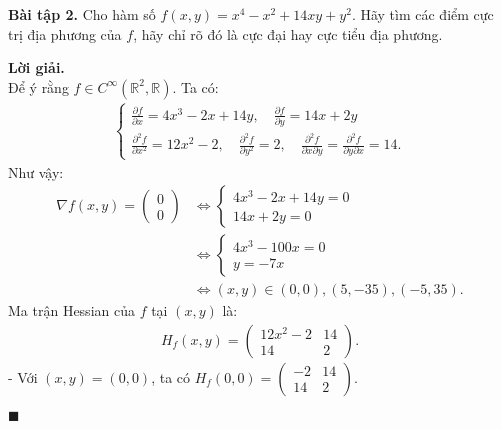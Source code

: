 \documentclass[12pt]{article}
\newcommand{\R}{\mathbb{R}}
\newenvironment{solution}{%
     \setlength\parindent{0pt}\par\medskip\textbf{Lời giải.}\quad}{%
     \hfill\tiny$\blacksquare$\par\medskip}
\begin{document}
    \textbf{Bài tập 2.} Cho hàm số $f(x, y) = x^4 - x^2 + 14xy + y^2$. Hãy tìm các điểm cực trị địa phương của $f$, hãy chỉ rõ đó là cực đại hay cực tiểu địa phương.
    \begin{solution}
        \\
        Để ý rằng $f \in C^{\infty}(\R^2, \R)$. Ta có:
        \begin{align*}
            \begin{cases}
                \frac{\partial f}{\partial x} = 4x^3 - 2x + 14y, \quad \frac{\partial f}{\partial y} = 14x + 2y\\
                \frac{\partial^2 f}{\partial x^2} = 12x^2 - 2, \quad \frac{\partial^2 f}{\partial y^2} = 2, \quad \frac{\partial^2 f}{\partial x \partial y} = \frac{\partial^2 f}{\partial y \partial x} = 14.
            \end{cases}
        \end{align*}
        Như vậy:
        \begin{align*}
            \nabla f(x, y) = \begin{pmatrix}
                0\\
                0
            \end{pmatrix} &\Leftrightarrow \begin{cases}
                4x^3 - 2x + 14y = 0\\
                14x + 2y = 0
            \end{cases}\\
            &\Leftrightarrow \begin{cases}
                4x^3 - 100x = 0\\
                y = -7x
            \end{cases}\\
            & \Leftrightarrow (x,y) \in {(0, 0), (5, -35), (-5, 35)}.
        \end{align*}
        Ma trận Hessian của $f$ tại $(x, y)$ là:
        \begin{align*}
            H_f(x, y) = \begin{pmatrix}
                12x^2 - 2 & 14\\
                14 & 2
            \end{pmatrix}.
        \end{align*}
        - Với $(x, y) = (0, 0)$, ta có $H_f(0, 0) = \begin{pmatrix}
            -2 & 14\\
            14 & 2
        \end{pmatrix}$.

\end{solution}
\end{document}
